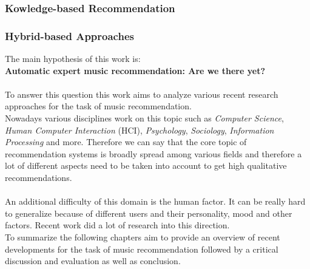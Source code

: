 \documentclass[runningheads,a4paper]{llncs}
\begin{document}
\subsubsection{Kowledge-based Recommendation}
\subsubsection{Hybrid-based Approaches}
\cite{jannach2010recommender}



The main hypothesis of this work is:\\
\textbf{Automatic expert music recommendation: Are we there yet?}\\
\\
To answer this question this work aims to analyze various recent research approaches for the task of music recommendation.\\
Nowadays various disciplines work on this topic such as \textit{Computer Science}, \textit{Human Computer Interaction} (HCI), 
\textit{Psychology}, \textit{Sociology}, \textit{Information Processing} and more. 
Therefore we can say that the core topic of recommendation systems is broadly spread among various fields and therefore 
a lot of different aspects need to be taken into account to get high qualitative recommendations. \\
\\
An additional difficulty of this domain is the human factor. It can be really hard to generalize because of 
different users and their personality, mood and other factors. Recent work did a lot of research into this direction.\\
To summarize the following chapters aim to provide an overview of recent developments for the task of music recommendation 
followed by a critical discussion and evaluation as well as conclusion. 
\end{document}
